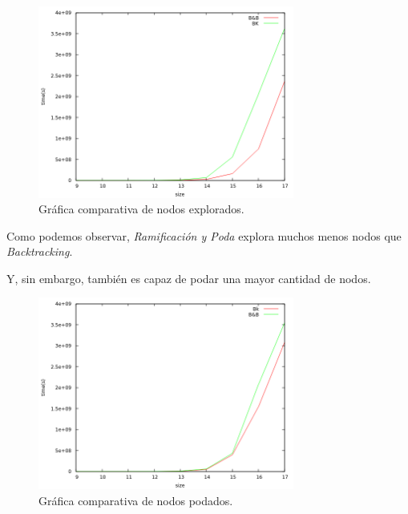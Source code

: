 \documentclass[11pt,a4paper]{article}
\begin{document}
		\begin{figure}[h]

			\centering
			\includegraphics[width=0.75\textwidth]{ComparativaExploradosBk-B&B.png}
			\caption{Gráfica comparativa de nodos explorados.}
			
		\end{figure}

		\vspace{2mm}

		\par
		Como podemos observar, \textit{Ramificación y Poda} explora muchos menos nodos que \textit{Backtracking}.

\newpage

		\par
		Y, sin embargo, también es capaz de podar una mayor cantidad de nodos.

		\vspace{2mm}

		\begin{figure}[h]

			\centering
			\includegraphics[width=0.75\textwidth]{ComparativaPodadosBk-B&B.png}
			\caption{Gráfica comparativa de nodos podados.}
			
		\end{figure}	
\end{document}
